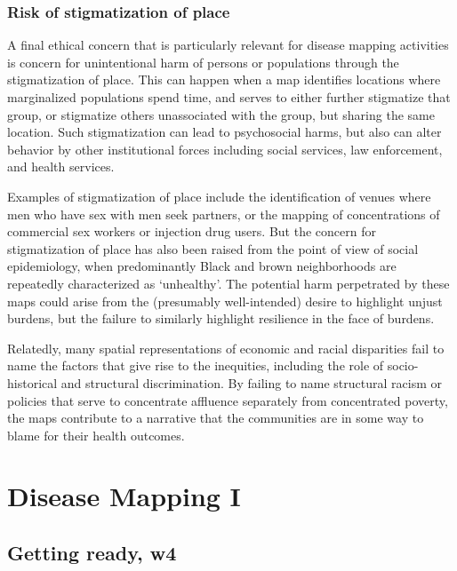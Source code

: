 \documentclass[
]{book}
\begin{document}
\hypertarget{risk-of-stigmatization-of-place}{%
\subsection{Risk of stigmatization of place}\label{risk-of-stigmatization-of-place}}

A final ethical concern that is particularly relevant for disease mapping activities is concern for unintentional harm of persons or populations through the stigmatization of place. This can happen when a map identifies locations where marginalized populations spend time, and serves to either further stigmatize that group, or stigmatize others unassociated with the group, but sharing the same location. Such stigmatization can lead to psychosocial harms, but also can alter behavior by other institutional forces including social services, law enforcement, and health services.

Examples of stigmatization of place include the identification of venues where men who have sex with men seek partners, or the mapping of concentrations of commercial sex workers or injection drug users. But the concern for stigmatization of place has also been raised from the point of view of social epidemiology, when predominantly Black and brown neighborhoods are repeatedly characterized as `unhealthy'. The potential harm perpetrated by these maps could arise from the (presumably well-intended) desire to highlight unjust burdens, but the failure to similarly highlight resilience in the face of burdens.

Relatedly, many spatial representations of economic and racial disparities fail to name the factors that give rise to the inequities, including the role of socio-historical and structural discrimination. By failing to name structural racism or policies that serve to concentrate affluence separately from concentrated poverty, the maps contribute to a narrative that the communities are in some way to blame for their health outcomes.

\hypertarget{disease-mapping-i}{%
\chapter{Disease Mapping I}\label{disease-mapping-i}}

\hypertarget{getting-ready-w4}{%
\section{Getting ready, w4}\label{getting-ready-w4}}
\end{document}
